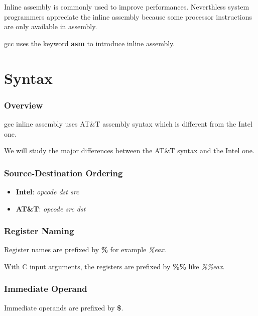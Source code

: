 {\begin{frame}
  Inline assembly is commonly used to improve performances. Neverthless
  system programmers appreciate the inline assembly because some
  processor instructions are only available in assembly.

  \nl

  gcc uses the keyword \textbf{asm} to introduce inline assembly.
\end{frame}

%
%

\section{Syntax}


\begin{frame}
  \frametitle{Overview}

  gcc inline assembly uses AT\&T assembly syntax which is
  different from the Intel one.

  \nl

  We will study the major differences between the AT\&T syntax and the
  Intel one.
\end{frame}


\begin{frame}
  \frametitle{Source-Destination Ordering}

  \begin{itemize}
    \item
      \textbf{Intel}: \textit{opcode dst src}
    \item
      \textbf{AT\&T}: \textit{opcode src dst}
  \end{itemize}
\end{frame}


\begin{frame}
  \frametitle{Register Naming}

  Register names are prefixed by \textbf{\%} for example \textit{\%eax}.

  \nl

  With C input arguments, the registers are prefixed by \textbf{\%\%}
  like \textit{\%\%eax}.
\end{frame}


\begin{frame}
  \frametitle{Immediate Operand}

  Immediate operands are prefixed by \textbf{\$}.


\end{frame}}
